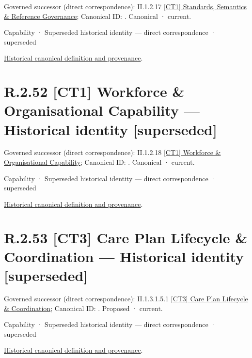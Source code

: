 {\small Governed successor (direct correspondence): II.1.2.17 \hyperref[element:5ffeb7401d314f06b05d79c3aff98242]{[CT1] Standards, Semantics \& Reference Governance}; Canonical ID: \texttt{}. Canonical · current.}\par
\label{element:3b65a3d007f54aa9b875e655475e1786}
{\small Capability · Superseded historical identity — direct correspondence · superseded}\par
\href{../../../../continuum/strategy/capability/3b65a3d007f54aa9b875e655475e1786.md}{Historical canonical definition and provenance}.\par
\section*{R.2.52 [CT1] Workforce \& Organisational Capability — Historical identity [superseded]}
\label{navigation:R.2.52}

{\small Governed successor (direct correspondence): II.1.2.18 \hyperref[element:631b43664bfb4c50ac8cf4958b2c347d]{[CT1] Workforce \& Organisational Capability}; Canonical ID: \texttt{}. Canonical · current.}\par
\label{element:b1161fe1a315420fbc7d048a1ea58126}
{\small Capability · Superseded historical identity — direct correspondence · superseded}\par
\href{../../../../continuum/strategy/capability/b1161fe1a315420fbc7d048a1ea58126.md}{Historical canonical definition and provenance}.\par
\section*{R.2.53 [CT3] Care Plan Lifecycle \& Coordination — Historical identity [superseded]}
\label{navigation:R.2.53}

{\small Governed successor (direct correspondence): II.1.3.1.5.1 \hyperref[element:4cb7db65392f4fab801d7794af4d4b29]{[CT3] Care Plan Lifecycle \& Coordination}; Canonical ID: \texttt{}. Proposed · current.}\par
\label{element:689bb3f8a24249b79f787e1f48eb268d}
{\small Capability · Superseded historical identity — direct correspondence · superseded}\par
\href{../../../../continuum/strategy/capability/689bb3f8a24249b79f787e1f48eb268d.md}{Historical canonical definition and provenance}.\par
